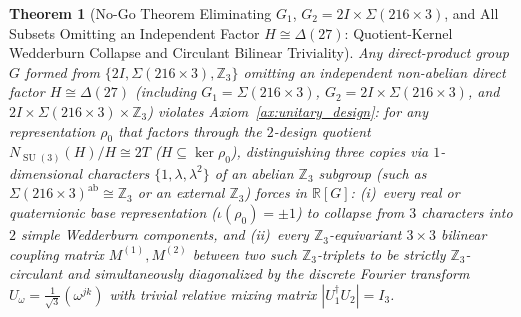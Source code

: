 \documentclass[11pt,a4paper]{article}
\newtheorem{theorem}{Theorem}[section]
\theoremstyle{definition}
\theoremstyle{remark}
\newcommand{\R}{\mathbb{R}}
\newcommand{\Z}{\mathbb{Z}}
\newcommand{\SU}{\operatorname{SU}}
\begin{document}
\begin{theorem}[No-Go Theorem Eliminating $G_1$, $G_2 = 2I \times \Sigma(216 \times 3)$, and All Subsets Omitting an Independent Factor $H \cong \Delta(27)$: Quotient-Kernel Wedderburn Collapse and Circulant Bilinear Triviality]
\label{thm:nogo2}
Any direct-product group $G$ formed from $\{2I, \Sigma(216 \times 3), \Z_3\}$ omitting an independent non-abelian direct factor $H \cong \Delta(27)$ (including $G_1 = \Sigma(216 \times 3)$, $G_2 = 2I \times \Sigma(216 \times 3)$, and $2I \times \Sigma(216 \times 3) \times \Z_3$) violates Axiom~\ref{ax:unitary_design}: for any representation $\rho_0$ that factors through the $2$-design quotient $N_{\SU(3)}(H)/H \cong 2T$ ($H \subseteq \ker\rho_0$), distinguishing three copies via $1$-dimensional characters $\{1, \lambda, \lambda^2\}$ of an abelian $\Z_3$ subgroup (such as $\Sigma(216 \times 3)^{\mathrm{ab}} \cong \Z_3$ or an external $\Z_3$) forces in $\R[G]$: (i)~every real or quaternionic base representation ($\iota(\rho_0) = \pm 1$) to collapse from $3$ characters into $2$ simple Wedderburn components, and (ii)~every $\Z_3$-equivariant $3 \times 3$ bilinear coupling matrix $M^{(1)}, M^{(2)}$ between two such $\Z_3$-triplets to be strictly $\Z_3$-circulant and simultaneously diagonalized by the discrete Fourier transform $U_\omega = \frac{1}{\sqrt{3}}(\omega^{jk})$ with trivial relative mixing matrix $|U_1^\dagger U_2| = I_3$.
\end{theorem}
\end{document}
